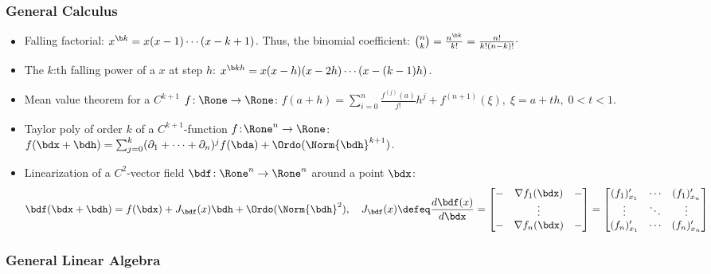 \documentclass[a4paper]{article}
\begin{document}
\subsubsection*{General Calculus} %

  \begin{itemize}

  \item Falling factorial: $x^{\scriptsize\b k}=x(x-1)\cdots(x-k+1)$. Thus,
    the binomial coefficient:
    $
      \binom{n}{k}
      = \frac{n^{\scriptsize\b k}}{k!}
      = \frac{n!}{k!(n-k)!}
      \cdot
    $

  \item The $k$:th falling power of a $x$ at step $h$:
    $
     x^{\scriptsize\b kh} =
     x(x-h)(x-2h)\cdots (x-(k-1)h)
    $.

  \item Mean value theorem for a $C^{k+1}$ $f\!:\Rone\to\Rone$:
    $
    f(a+h)
    =\sum_{i=0}^n\frac{f^{(j)}(a)}{j!}h^j
             + f^{(n+1)}(\xi),
             \; \xi=a+th,
             \; 0<t<1
    $.

  \item Taylor poly of order $k$ of a $C^{k+1}$-function $f\!:\!\Rone^n\to\Rone$:
    $f(\bdx+\bdh)=\sum_{j=0}^k
    (\partial_1+\cdots+\partial_n)^j f(\bda)+\Ordo(\Norm{\bdh}^{k+1})$.

  \item Linearization of a $C^2$-vector field $\bdf\!:\Rone^n\to\Rone^n$
     around a point $\bdx$:
   \[
     \bdf(\bdx+\bdh)
     =
     f(\bdx)
     +J_{\bdf}(x)\bdh + \Ordo(\Norm{\bdh}^2),
     \quad
     J_{\bdf}(x)
     \defeq\frac{d\bdf(x)}{d\bdx}
     =
     \begin{bmatrix}
       - & \nabla f_1(\bdx) & - \\
         & \vdots & \\
       - & \nabla f_n(\bdx) & - \\
     \end{bmatrix}
     =
     \begin{bmatrix}
       (f_1)'_{x_1} &\cdots&(f_1)'_{x_n} \\
       \vdots & \ddots & \vdots \\
       (f_n)'_{x_1} &\cdots&(f_n)'_{x_n} \\
     \end{bmatrix}
      \]
\end{itemize}


\subsubsection*{General Linear Algebra}%
\end{document}
